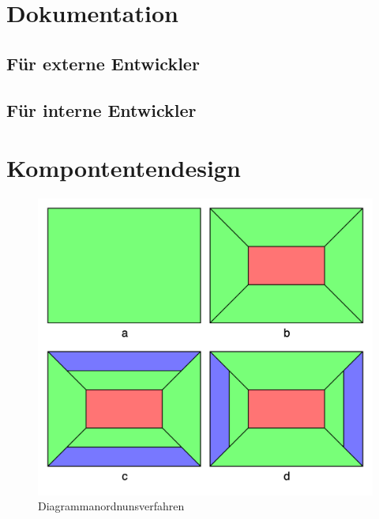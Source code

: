\section{Dokumentation}
\subsection{Für externe Entwickler}

\subsection{Für interne Entwickler}


\section{Kompontentendesign}
\label{sec:komponentendesign}



\begin{figure}
    \label{figure:diagrammanordnungsverfahren}
    \begin{center}
    \includegraphics[scale=0.2]{img/abbildungen/Diagrammanordnunsverfahren}
    \end{center}
    \caption{Diagrammanordnunsverfahren}
\end{figure}

